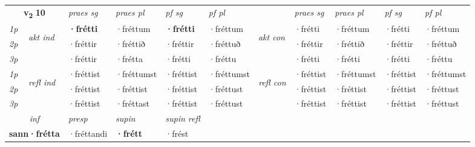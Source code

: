 \noindent
\begin{tabular}{lllllllllll} \toprule
\multicolumn{2}{c}{\textbf{v{\textsubscript{2}}} \Large{\textbf{10}}}  &  \textit{praes sg}  & \textit{praes pl}  &\textit{ pf sg} & \textit{pf pl} &  &  \textit{praes sg}  & \textit{praes pl}  & \textit{pf sg} & \textit{pf pl } \\*
	\cmidrule{3-6} \cmidrule{8-11}
 {\textit{1p}} & \multirow{3}{*}{\begin{turn}{90}\textit{akt ind}\end{turn}} & \textbf{·frétti} & ·fréttum & \textbf{·frétti} & ·fréttum & \multirow{3}{*}{\begin{turn}{90}\textit{akt con}\end{turn}} &·frétti & ·fréttum & ·frétti & ·fréttum\\*
 {\textit{2p}} &  &  ·fréttir  & ·fréttið & ·fréttir & ·fréttuð & & ·fréttir & ·fréttið & ·fréttir & ·fréttuð \\*
{\textit{3p}} &  & ·fréttir & ·frétta & ·frétti & ·fréttu & & ·frétti & ·frétti& ·frétti & ·fréttu \\*
\cmidrule{3-6} \cmidrule{8-11}
 {\textit{1p}} & \multirow{3}{*}{\begin{turn}{90}\textit{refl ind}\end{turn}}  & ·fréttist & ·fréttumst & ·fréttist & ·fréttumst & \multirow{3}{*}{\begin{turn}{90}\textit{refl con}\end{turn}}  &·fréttist & ·fréttumst & ·fréttist & ·fréttumst \\*
 {\textit{2p}} &  & ·fréttist & ·fréttist & ·fréttist & ·fréttust & &·fréttist & ·fréttist & ·fréttist & ·fréttust \\*
 {\textit{3p}}  & & ·fréttist & ·fréttast & ·fréttist & ·fréttust & & ·fréttist & ·fréttist& ·fréttist & ·fréttust \\*
\cmidrule{3-6} \cmidrule{8-11}

   \multicolumn{2}{c}{\textit{inf}}     & \textit{presp} & \textit{supin} & \textit{supin refl}  \\*
  \multicolumn{2}{c}{\textbf{sann\allowbreak ·frétta}}      & ·fréttandi &  \textbf{·frétt} & ·frést  \\*
\end{tabular}

